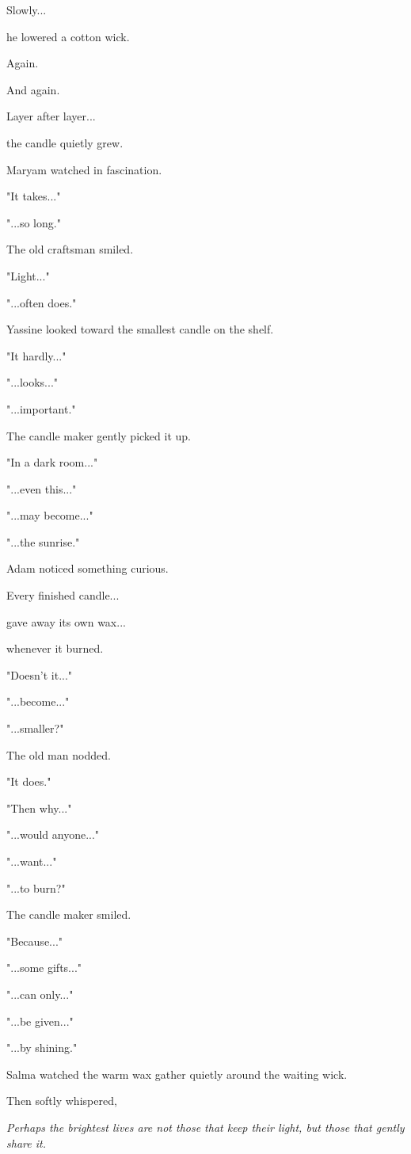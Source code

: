 \documentclass[12pt,openany]{book}
\begin{document}
Slowly...

he lowered a cotton wick.

Again.

And again.

Layer after layer...

the candle quietly grew.

Maryam watched in fascination.

"It takes..."

"...so long."

The old craftsman smiled.

"Light..."

"...often does."

Yassine looked toward the smallest candle on the shelf.

"It hardly..."

"...looks..."

"...important."

The candle maker gently picked it up.

"In a dark room..."

"...even this..."

"...may become..."

"...the sunrise."

Adam noticed something curious.

Every finished candle...

gave away its own wax...

whenever it burned.

"Doesn't it..."

"...become..."

"...smaller?"

The old man nodded.

"It does."

"Then why..."

"...would anyone..."

"...want..."

"...to burn?"

The candle maker smiled.

"Because..."

"...some gifts..."

"...can only..."

"...be given..."

"...by shining."

Salma watched the warm wax gather quietly around the waiting wick.

Then softly whispered,

\emph{Perhaps the brightest lives are not those that keep their light, but those that gently share it.}
\end{document}
